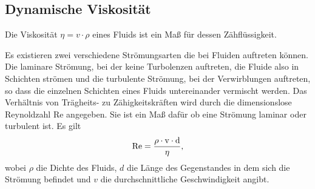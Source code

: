 \documentclass[12pt, a4paper, twoside]{scrartcl}
\begin{document}
\subsection{Dynamische Viskosität}
Die Viskosität $\eta=v\cdot\rho$ eines Fluids ist ein Maß für dessen Zähflüssigkeit.\linebreak

Es existieren zwei verschiedene Strömungsarten die bei Fluiden auftreten können. Die laminare Strömung, bei der keine Turbolenzen auftreten, die Fluide also in Schichten strömen und die turbulente Strömung, bei der Verwirblungen auftreten, so dass die einzelnen Schichten eines Fluids untereinander vermischt werden.\newline
Das Verhältnis von Trägheits- zu Zähigkeitskräften wird durch die dimensionslose  Reynoldzahl Re angegeben. Sie ist ein Maß dafür ob eine Strömung laminar oder turbulent ist. Es gilt
\begin{align*}
  \rm{Re}=\frac{\rho\cdot v\cdot d}{\eta},
\end{align*}
 wobei $\rho$ die Dichte des Fluids, $d$ die Länge des Gegenstandes in dem sich die Strömung befindet und $v$ die durchschnittliche Geschwindigkeit  angibt.\linebreak
 
\end{document}
